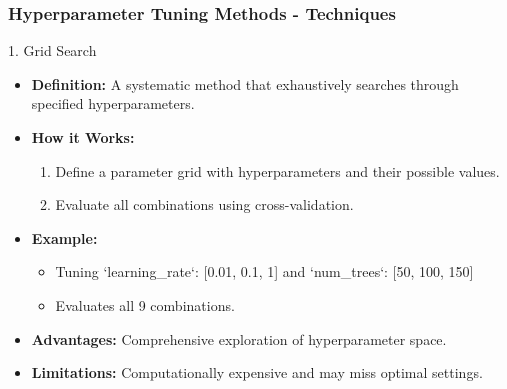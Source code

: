 \documentclass[aspectratio=169]{beamer}
\begin{document}
\begin{frame}[fragile]
    \frametitle{Hyperparameter Tuning Methods - Techniques}
    \begin{block}{1. Grid Search}
        \begin{itemize}
            \item \textbf{Definition:} A systematic method that exhaustively searches through specified hyperparameters.
            \item \textbf{How it Works:}
            \begin{enumerate}
                \item Define a parameter grid with hyperparameters and their possible values.
                \item Evaluate all combinations using cross-validation.
            \end{enumerate}
            \item \textbf{Example:} 
            \begin{itemize}
                \item Tuning `learning\_rate`: [0.01, 0.1, 1] and `num\_trees`: [50, 100, 150]
                \item Evaluates all 9 combinations.
            \end{itemize}
            \item \textbf{Advantages:} Comprehensive exploration of hyperparameter space.
            \item \textbf{Limitations:} Computationally expensive and may miss optimal settings.
        \end{itemize}
    \end{block}
\end{frame}
\end{document}

